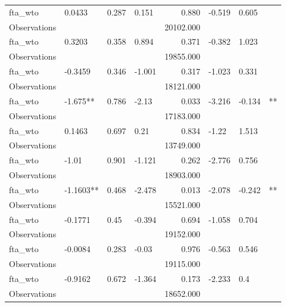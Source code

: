\begin{tabular}{llllrlll}
fta\_wto      &     0.0433 &   0.287 &  0.151 &      0.880 & -0.519 &  0.605 &              \\
Observations &            &         &        &  20102.000 &        &        &              \\
fta\_wto      &     0.3203 &   0.358 &  0.894 &      0.371 & -0.382 &  1.023 &              \\
Observations &            &         &        &  19855.000 &        &        &              \\
fta\_wto      &    -0.3459 &   0.346 & -1.001 &      0.317 & -1.023 &  0.331 &              \\
Observations &            &         &        &  18121.000 &        &        &              \\
fta\_wto      &   -1.675** &   0.786 &  -2.13 &      0.033 & -3.216 & -0.134 &           ** \\
Observations &            &         &        &  17183.000 &        &        &              \\
fta\_wto      &     0.1463 &   0.697 &   0.21 &      0.834 &  -1.22 &  1.513 &              \\
Observations &            &         &        &  13749.000 &        &        &              \\
fta\_wto      &      -1.01 &   0.901 & -1.121 &      0.262 & -2.776 &  0.756 &              \\
Observations &            &         &        &  18903.000 &        &        &              \\
fta\_wto      &  -1.1603** &   0.468 & -2.478 &      0.013 & -2.078 & -0.242 &           ** \\
Observations &            &         &        &  15521.000 &        &        &              \\
fta\_wto      &    -0.1771 &    0.45 & -0.394 &      0.694 & -1.058 &  0.704 &              \\
Observations &            &         &        &  19152.000 &        &        &              \\
fta\_wto      &    -0.0084 &   0.283 &  -0.03 &      0.976 & -0.563 &  0.546 &              \\
Observations &            &         &        &  19115.000 &        &        &              \\
fta\_wto      &    -0.9162 &   0.672 & -1.364 &      0.173 & -2.233 &    0.4 &              \\
Observations &            &         &        &  18652.000 &        &        &              \\

\end{tabular}
